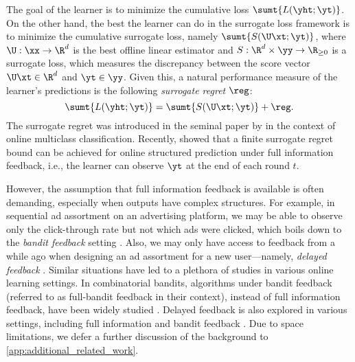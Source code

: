 The goal of the learner is to minimize the cumulative loss $\sumt{L(\yht;\yt)}$. 
On the other hand, the best the learner can do in the surrogate loss framework is to minimize the cumulative surrogate loss, namely $\sumt{S(\U\xt;\yt)}$, where $\U:\xx\to\R^d$ is the best offline linear estimator and $S:\R^d\times\yy\to\R_{\geq0}$ is a surrogate loss, which measures the discrepancy between the score vector $\U\xt \in \R^d$ and $\yt\in\yy$. 
Given this, a natural performance measure of the learner's predictions is the following \emph{surrogate regret} $\reg$: 
\begin{equation}\label{eq:sur_regret}
    \sumt{L(\yht;\yt)}=\sumt{S(\U\xt;\yt)}+\reg.
\end{equation}
The surrogate regret was introduced in the seminal paper by  in the context of online multiclass classification.  
Recently, \citet{pmlr-v247-sakaue24a} showed that a finite surrogate regret bound  
can be achieved for online structured prediction under full information feedback, i.e., the learner can observe $\yt$ at the end of each round $t$.

However, the assumption that full information feedback is available is often demanding, especially when outputs have complex structures.
%
For example, in sequential ad assortment on an advertising platform, we may be able to observe only the click-through rate but not which ads were clicked, which boils down to the \emph{bandit feedback} setting \citep{Kakade2008EfficientBA,JMLR:v15:gentile:class_ranking}. 
Also, we may only have access to feedback from a while ago when designing an ad assortment for a new user—namely, \emph{delayed feedback}  \citep{Weinberger_2002_delay,manwani2022delaytronefficientlearningmulticlass}.
%
Similar situations have led to a plethora of studies in various online learning settings.
In combinatorial bandits, algorithms under bandit feedback (referred to as full-bandit feedback in their context), instead of full information feedback, have been widely studied
\citep{comband,combes15combinatorial,rejwan20topk,du21combinatorial}. 
Delayed feedback is also explored in various settings, including full information and bandit feedback \citep{joulani13online,cesabianchi16delay}.
Due to space limitations, we defer a further discussion of the background to \cref{app:additional_related_work}.


